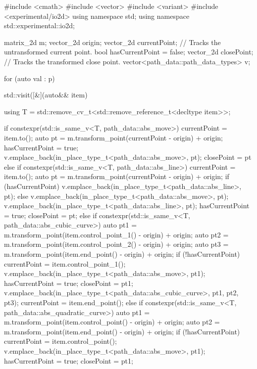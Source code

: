 \begin{codeblock}
  #include <cmath>
  #include <vector>
  #include <variant>
  #include <experimental/io2d>
  using namespace std;
  using namespace std::experimental::io2d;
  
  matrix_2d m;
  vector_2d origin;
  vector_2d currentPoint; // Tracks the untransformed current point.
  bool hasCurrentPoint = false;
  vector_2d closePoint;   // Tracks the transformed close point.
  vector<path_data::path_data_types> v;
  
  for (auto val : p) {
    std::visit([&](auto&& item) {
      using T = std::remove_cv_t<std::remove_reference_t<decltype item>>;

      if constexpr(std::is_same_v<T, path_data::abs_move>) {
        currentPoint = item.to();
        auto pt = m.transform_point(currentPoint - origin) + origin;
        hasCurrentPoint = true;
        v.emplace_back(in_place_type_t<path_data::abs_move>, pt);
        closePoint = pt
      }
      else if constexpr(std::is_same_v<T, path_data::abs_line>) {
        currentPoint = item.to();
        auto pt = m.transform_point(currentPoint - origin) + origin;
        if (hasCurrentPoint) {
          v.emplace_back(in_place_type_t<path_data::abs_line>, pt);
        }
        else {
          v.emplace_back(in_place_type_t<path_data::abs_move>, pt);
          v.emplace_back(in_place_type_t<path_data::abs_line>, pt);
          hasCurrentPoint = true;
          closePoint = pt;
        }
      }
      else if constexpr(std::is_same_v<T, path_data::abs_cubic_curve>) {
        auto pt1 = m.transform_point(item.control_point_1() - origin) + origin;
        auto pt2 = m.transform_point(item.control_point_2() - origin) + origin;
        auto pt3 = m.transform_point(item.end_point() - origin) + origin;
        if (!hasCurrentPoint) {
          currentPoint = item.control_point_1();
          v.emplace_back(in_place_type_t<path_data::abs_move>, pt1);
          hasCurrentPoint = true;
          closePoint = pt1;
        }
        v.emplace_back(in_place_type_t<path_data::abs_cubic_curve>, pt1,
          pt2, pt3);
        currentPoint = item.end_point();
      }
      else if constexpr(std::is_same_v<T,
        path_data::abs_quadratic_curve>) {
      	auto pt1 = m.transform_point(item.control_point() - origin) + origin;
      	auto pt2 = m.transform_point(item.end_point() - origin) + origin;
      	if (!hasCurrentPoint) {
      		currentPoint = item.control_point();
      		v.emplace_back(in_place_type_t<path_data::abs_move>, pt1);
      		hasCurrentPoint = true;
      		closePoint = pt1;
}}}}
\end{codeblock}
